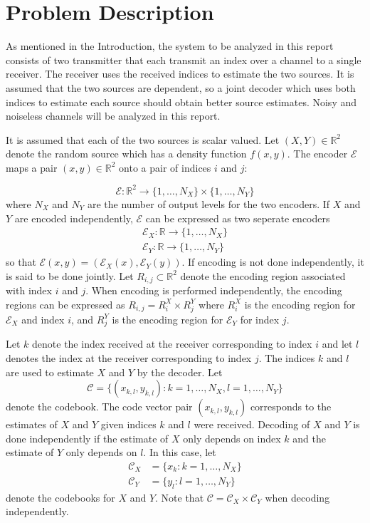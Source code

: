 \documentclass[10pt]{article}
\newcommand{\real}{\mathbb{R}}
\begin{document}
\section{Problem Description}
\label{sec:prob_desc}
As mentioned in the Introduction, the system to be analyzed in this report consists of two transmitter that each transmit an index over a channel to a single receiver. The receiver uses the received indices to estimate the two sources. It is assumed that the two sources are dependent, so a joint decoder which uses both indices to estimate each source should obtain better source estimates. Noisy and noiseless channels will be analyzed in this report.

It is assumed that each of the two sources is scalar valued. Let $(X,Y)\in\real^2$ denote the random source which has a density function $f(x,y)$. The encoder $\mathcal{E}$ maps a pair $(x,y) \in \mathbb{R}^2$ onto a pair of indices $i$ and $j$:

\begin{equation*}
    \mathcal{E} : \real^2\to\{1,\ldots,N_X\} \times \{1,\ldots,N_Y\}
\end{equation*}
where $N_X$ and $N_Y$ are the number of output levels for the two encoders. If $X$ and $Y$ are encoded independently, $\mathcal{E}$ can be expressed as two seperate encoders
\begin{gather*}
    \mathcal{E}_X : \real\to\{1,\ldots,N_X\} \\
    \mathcal{E}_Y : \real\to\{1,\ldots,N_Y\}
\end{gather*}
so that $\mathcal{E}(x,y) = (\mathcal{E}_X(x), \mathcal{E}_Y(y))$. If encoding is not done independently, it is said to be done jointly. Let $R_{i,j} \subset \mathbb{R}^2$ denote the encoding region associated with index $i$ and $j$. When encoding is performed independently, the encoding regions can be expressed as $R_{i,j} = R_i^X \times R_j^Y$ where $R_i^X$ is the encoding region for $\mathcal{E}_X$ and index $i$, and $R_j^Y$ is the encoding region for $\mathcal{E}_Y$ for index $j$.

Let $k$ denote the index received at the receiver corresponding to index $i$ and let $l$ denotes the index at the receiver corresponding to index $j$. The indices $k$ and $l$ are used to estimate $X$ and $Y$ by the decoder. Let 
\begin{equation}
\mathcal{C} = \{ (x_{k,l},y_{k,l}) : k = 1,\ldots,N_X, l = 1,\ldots,N_Y\}
\end{equation}
denote the codebook. The code vector pair $(x_{k,l},y_{k,l})$ corresponds to the estimates of $X$ and $Y$ given indices $k$ and $l$ were received. Decoding of $X$ and $Y$ is done independently if the estimate of $X$ only depends on index $k$ and the estimate of $Y$ only depends on $l$. In this case, let
\begin{align}
\mathcal{C}_X &= \{x_k : k = 1,\ldots,N_X\} \\
\mathcal{C}_Y &= \{y_l : l = 1,\ldots,N_Y\}
\end{align}
denote the codebooks for $X$ and $Y$. Note that $\mathcal{C} = \mathcal{C}_X \times \mathcal{C}_Y$ when decoding independently.
\end{document}
